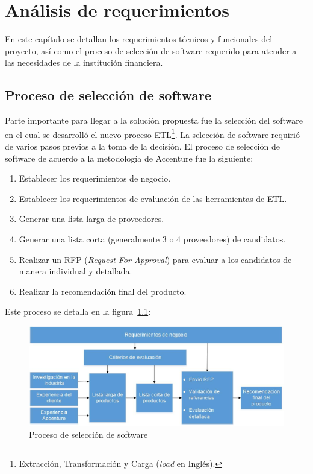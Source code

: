 \chapter{Análisis de requerimientos}
\label{cap:analisis}

En este capítulo se detallan los requerimientos técnicos y funcionales del proyecto, así como el proceso de selección de software requerido para atender a las necesidades de la institución financiera.

\section{Proceso de selección de software}

Parte importante para llegar a la solución propuesta fue la selección del
software en el cual se desarrolló el nuevo proceso ETL\footnote{Extracción,
  Transformación y Carga (\emph{load} en Inglés).}. La selección de software
requirió de varios pasos previos a la toma de la decisión. El proceso de
selección de software de acuerdo a la metodología de Accenture fue la siguiente:

\begin{enumerate}
\item Establecer los requerimientos de negocio.
\item Establecer los requerimientos de evaluación de las herramientas de ETL.
\item Generar una lista larga de proveedores.
\item Generar una lista corta (generalmente 3 o 4 proveedores) de candidatos.
\item Realizar un RFP (\emph{Request For Approval}) para evaluar a los
  candidatos de manera individual y detallada.
\item Realizar la recomendación final del producto.
\end{enumerate}

Este proceso se detalla en la figura~\ref{fig:proceso}:

\begin{figure}[htb]
  \begin{center}
    \includegraphics[width=\linewidth]{Proceso_seleccion_software.jpg}
    \caption{Proceso de selección de software}
    \label{fig:proceso}
  \end{center}
\end{figure}

